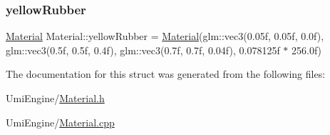 \subsubsection{\texorpdfstring{yellowRubber}{yellowRubber}}
{\footnotesize\ttfamily \mbox{\hyperlink{struct_material}{Material}} Material\+::yellow\+Rubber = \mbox{\hyperlink{struct_material}{Material}}(glm\+::vec3(0.\+05f, 0.\+05f, 0.\+0f), glm\+::vec3(0.\+5f, 0.\+5f, 0.\+4f), glm\+::vec3(0.\+7f, 0.\+7f, 0.\+04f), 0.\+078125f $\ast$ 256.\+0f)\hspace{0.3cm}{\ttfamily [static]}}



The documentation for this struct was generated from the following files\+:\begin{DoxyCompactItemize}
\item 
Umi\+Engine/\mbox{\hyperlink{_material_8h}{Material.\+h}}\item 
Umi\+Engine/\mbox{\hyperlink{_material_8cpp}{Material.\+cpp}}\end{DoxyCompactItemize}
